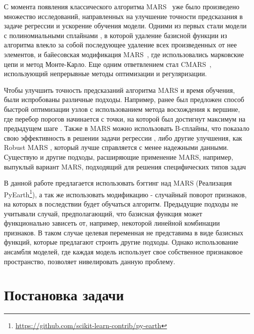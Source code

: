 \documentclass{article}
\newcommand{\cmmnt}[1]{}
\begin{document}
С момента появления классического алгоритма MARS~\cite{friedman1991multivariate} уже было произведено множество исследований, направленных на улучшение точности предсказания в задаче регрессии и ускорение обучения модели. Одними из первых стали модели с полиномиальными сплайнами \cite{stone1997polynomial}, в которой удаление базисной функции из алгоритма влекло за собой последующее удаление всех произведенных от нее элементов, и байесовская модификация MARS~\cite{denison1998bayesian}, где использовались марковские цепи и метод Монте-Карло.
Еще одним ответвлением стал CMARS~\cite{weber2012cmars}, использующий непрерывные методы оптимизации и регуляризации. 

Чтобы улучшить точность предсказаний алгоритма MARS и время обучения, были испробованы различные подходы. Например, ранее был предложен способ быстрой оптимизации узлов с использованием метода восхождения к вершине, где перебор порогов начинается с точки, на которой был достигнут максимум на предыдущем шаге \cmmnt{(Xinglong Ju, Victoria C.P. Chen, 2021)} \cite{ju2021fast}. Также в MARS можно использовать B-сплайны, что показало свою эффективность в решении задачи регрессии \cmmnt{(Sergey Bakin, Markus Hegland \& Michael R. Osborne, 2000)} \cite{bakin2000parallel}, либо другие улучшения, как Robust MARS \cmmnt{(Ozmen \& Weber, 2014)} \cite{ozmen2011rcmars}, который лучше справляется с менее надежными данными. Существую и другие подходы, расширяющие применение MARS, например, выпуклый вариант MARS, подходящий для решения специфических типов задач \cmmnt{(Martinez, Diana L., et al, 2015)}\cite{martinez2015convex}

В данной работе предлагается использовать бэггинг над MARS (Реализация PyEarth\footnote{\url{https://github.com/scikit-learn-contrib/py-earth}}), а так же использовать модификацию - случайный поворот признаков, на которых в последствии будет обучаться алгоритм. Предыдущие подходы не учитывали случай, предполагающий, что базисная функция может функционально зависеть от, например, некоторой линейной комбинации признаков. В таком случае целевая переменная не представима в виде базисных функций, которые предлагают строить другие подходы. Однако использование ансамбля моделей, где каждая модель использует свое собственное признаковое пространство, позволяет нивелировать данную проблему.

\section{Постановка задачи}
\label{sec:headings}
\end{document}
